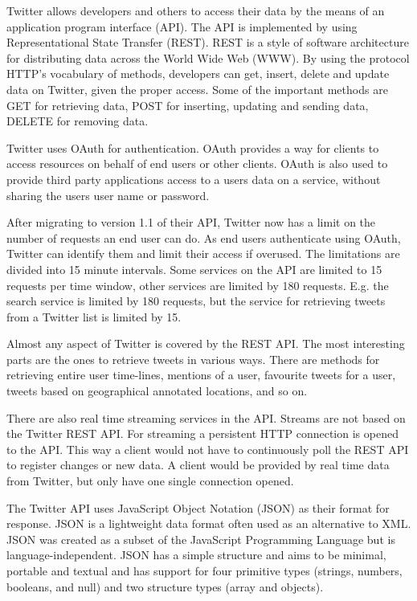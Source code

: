 Twitter allows developers and others to access their data by the means of an application program interface (API). The API is implemented by using Representational State Transfer (REST). REST is a style of software architecture for distributing data across the World Wide Web (WWW). By using the protocol HTTP's vocabulary of methods, developers can get, insert, delete and update data on Twitter, given the proper access. Some of the important methods are GET for retrieving data, POST for inserting, updating and sending data, DELETE for removing data.~\cite{article:rest}

Twitter uses OAuth for authentication. OAuth provides a way for clients to access resources on behalf of end users or other clients. OAuth is also used to provide third party applications access to a users data on a service, without sharing the users user name or password. \cite{site:oauth}

After migrating to version 1.1 of their API, Twitter now has a limit on the number of requests an end user can do. As end users authenticate using OAuth, Twitter can identify them and limit their access if overused. The limitations are divided into 15 minute intervals. Some services on the API are limited to 15 requests per time window, other services are limited by 180 requests. E.g. the search service is limited by 180 requests, but the service for retrieving tweets from a Twitter list is limited by 15.~\cite{site:twitterlimit}

Almost any aspect of Twitter is covered by the REST API. The most interesting parts are the ones to retrieve tweets in various ways. There are methods for retrieving entire user time-lines, mentions of a user, favourite tweets for a user, tweets based on geographical annotated locations, and so on.~\cite{site:twitterapi}

There are also real time streaming services in the API. Streams are not based on the Twitter REST API. For streaming a persistent HTTP connection is opened to the API. This way a client would not have to continuously poll the REST API to register changes or new data. A client would be provided by real time data from Twitter, but only have one single connection opened.~\cite{site:twitterstream}

The Twitter API uses JavaScript Object Notation (JSON) as their format for response. JSON is a lightweight data format often used as an alternative to XML. JSON was created as a subset of the JavaScript Programming Language but is language-independent. JSON has a simple structure and aims to be minimal, portable and textual and has support for four primitive types (strings, numbers, booleans, and null) and two structure types (array and objects).~\cite{site:json}

